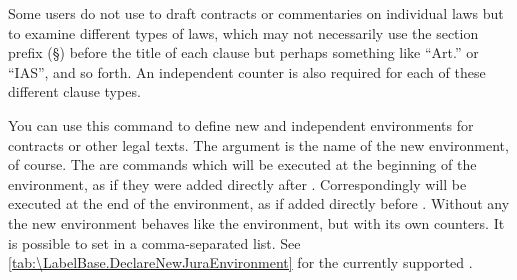 Some users do not use  to draft contracts or commentaries on
individual laws but to examine different types of laws, which may not
necessarily use the section prefix (\S) before the title of each clause but
perhaps something like ``Art.'' or ``IAS'', and so forth. An independent
counter is also required for each of these different clause types.

\begin{Declaration}
\end{Declaration}
You can use this command to define new and
independent environments for contracts or other legal texts. The argument
 is the name of the new environment, of course. The  are commands which will be executed at the beginning of the
environment, as if they were added directly after
. Correspondingly  will be
executed at the end of the environment, as if added directly before
. Without any  the new environment
behaves like the  environment, but with its
own counters. It is possible to set  in a comma-separated list.
See \autoref{tab:\LabelBase.DeclareNewJuraEnvironment} for the currently
supported .

